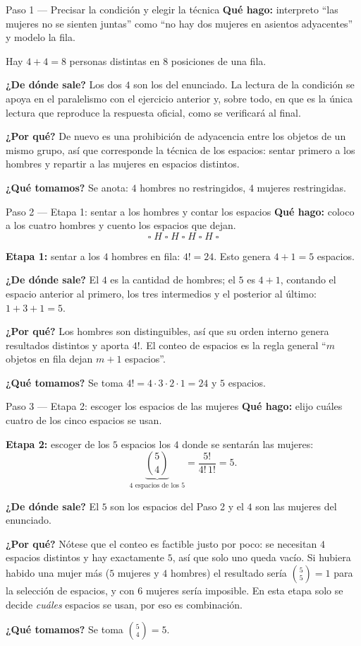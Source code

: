 \documentclass[11pt]{article}
\begin{document}
\begin{paso}{Paso 1 --- Precisar la condición y elegir la técnica}
\textbf{Qué hago:} interpreto ``las mujeres no se sienten juntas'' como ``no hay dos mujeres en asientos adyacentes'' y modelo la fila.

Hay $4+4=8$ personas distintas en $8$ posiciones de una fila.

\textbf{¿De dónde sale?} Los dos $4$ son los del enunciado. La lectura de la condición se apoya en el paralelismo con el ejercicio anterior y, sobre todo, en que es la única lectura que reproduce la respuesta oficial, como se verificará al final.

\textbf{¿Por qué?} De nuevo es una prohibición de adyacencia entre los objetos de un mismo grupo, así que corresponde la técnica de los espacios: sentar primero a los hombres y repartir a las mujeres en espacios distintos.

\textbf{¿Qué tomamos?} Se anota: $4$ hombres no restringidos, $4$ mujeres restringidas.
\end{paso}

\begin{paso}{Paso 2 --- Etapa 1: sentar a los hombres y contar los espacios}
\textbf{Qué hago:} coloco a los cuatro hombres y cuento los espacios que dejan.
\[
  \square\; H \;\square\; H \;\square\; H \;\square\; H \;\square
\]

\medskip
\textbf{Etapa 1:} sentar a los $4$ hombres en fila: $4!=24$. Esto genera $4+1=5$ espacios.

\textbf{¿De dónde sale?} El $4$ es la cantidad de hombres; el $5$ es $4+1$, contando el espacio anterior al primero, los tres intermedios y el posterior al último: $1+3+1=5$.

\textbf{¿Por qué?} Los hombres son distinguibles, así que su orden interno genera resultados distintos y aporta $4!$. El conteo de espacios es la regla general ``$m$ objetos en fila dejan $m+1$ espacios''.

\textbf{¿Qué tomamos?} Se toma $4!=4\cdot 3\cdot 2\cdot 1 = 24$ y $5$ espacios.
\end{paso}

\begin{paso}{Paso 3 --- Etapa 2: escoger los espacios de las mujeres}
\textbf{Qué hago:} elijo cuáles cuatro de los cinco espacios se usan.

\medskip
\textbf{Etapa 2:} escoger de los $5$ espacios los $4$ donde se sentarán las mujeres:
\[
  \underbrace{\binom{5}{4}}_{\text{4 espacios de los 5}} = \frac{5!}{4!\,1!} = 5 .
\]

\textbf{¿De dónde sale?} El $5$ son los espacios del Paso 2 y el $4$ son las mujeres del enunciado.

\textbf{¿Por qué?} Nótese que el conteo es factible justo por poco: se necesitan $4$ espacios distintos y hay exactamente $5$, así que solo uno queda vacío. Si hubiera habido una mujer más ($5$ mujeres y $4$ hombres) el resultado sería $\binom{5}{5}=1$ para la selección de espacios, y con $6$ mujeres sería imposible. En esta etapa solo se decide \emph{cuáles} espacios se usan, por eso es combinación.

\textbf{¿Qué tomamos?} Se toma $\binom{5}{4}=5$.
\end{paso}
\end{document}
